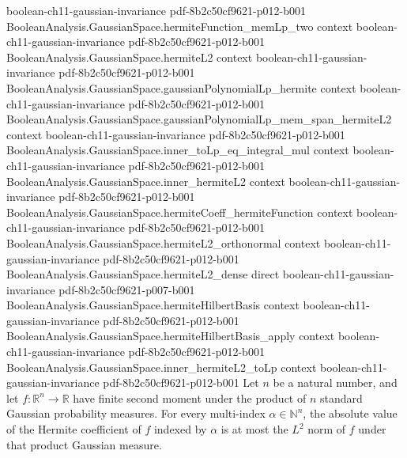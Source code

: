 \begin{lemma}
  {boolean-ch11-gaussian-invariance}
  {pdf-8b2c50cf9621-p012-b001}
\proofstep
  {BooleanAnalysis.GaussianSpace.hermiteFunction_memLp_two}
  {context}
  {boolean-ch11-gaussian-invariance}
  {pdf-8b2c50cf9621-p012-b001}
\proofstep
  {BooleanAnalysis.GaussianSpace.hermiteL2}
  {context}
  {boolean-ch11-gaussian-invariance}
  {pdf-8b2c50cf9621-p012-b001}
\proofstep
  {BooleanAnalysis.GaussianSpace.gaussianPolynomialLp_hermite}
  {context}
  {boolean-ch11-gaussian-invariance}
  {pdf-8b2c50cf9621-p012-b001}
\proofstep
  {BooleanAnalysis.GaussianSpace.gaussianPolynomialLp_mem_span_hermiteL2}
  {context}
  {boolean-ch11-gaussian-invariance}
  {pdf-8b2c50cf9621-p012-b001}
\proofstep
  {BooleanAnalysis.GaussianSpace.inner_toLp_eq_integral_mul}
  {context}
  {boolean-ch11-gaussian-invariance}
  {pdf-8b2c50cf9621-p012-b001}
\proofstep
  {BooleanAnalysis.GaussianSpace.inner_hermiteL2}
  {context}
  {boolean-ch11-gaussian-invariance}
  {pdf-8b2c50cf9621-p012-b001}
\proofstep
  {BooleanAnalysis.GaussianSpace.hermiteCoeff_hermiteFunction}
  {context}
  {boolean-ch11-gaussian-invariance}
  {pdf-8b2c50cf9621-p012-b001}
\proofstep
  {BooleanAnalysis.GaussianSpace.hermiteL2_orthonormal}
  {context}
  {boolean-ch11-gaussian-invariance}
  {pdf-8b2c50cf9621-p012-b001}
\proofstep
  {BooleanAnalysis.GaussianSpace.hermiteL2_dense}
  {direct}
  {boolean-ch11-gaussian-invariance}
  {pdf-8b2c50cf9621-p007-b001}
\proofstep
  {BooleanAnalysis.GaussianSpace.hermiteHilbertBasis}
  {context}
  {boolean-ch11-gaussian-invariance}
  {pdf-8b2c50cf9621-p012-b001}
\proofstep
  {BooleanAnalysis.GaussianSpace.hermiteHilbertBasis_apply}
  {context}
  {boolean-ch11-gaussian-invariance}
  {pdf-8b2c50cf9621-p012-b001}
\proofstep
  {BooleanAnalysis.GaussianSpace.inner_hermiteL2_toLp}
  {context}
  {boolean-ch11-gaussian-invariance}
  {pdf-8b2c50cf9621-p012-b001}
Let $n$ be a natural number, and let $f:\mathbb R^n\to\mathbb R$ have finite second
moment under the product of $n$ standard Gaussian probability measures. For every
multi-index $\alpha\in\mathbb N^n$, the absolute value of the Hermite coefficient of $f$
indexed by $\alpha$ is at most the $L^2$ norm of $f$ under that product Gaussian
measure.
\end{lemma}

